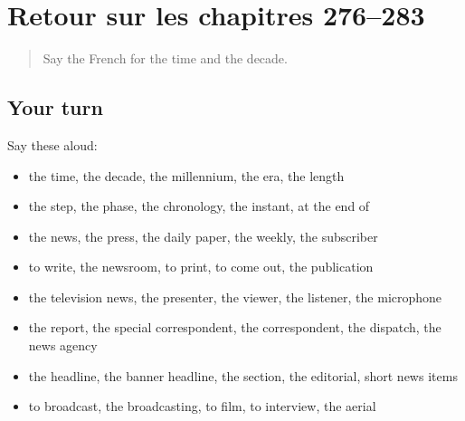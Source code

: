\section[(dialogue)]{Retour sur les chapitres 276–283}

\label{lesson:FR-R283-revision-276-283}



\begin{quote}
Say the French for the time and the decade.
\end{quote}

\subsection*{Your turn}
Say these aloud:

\begin{itemize}
\raggedright
  \item the time, the decade, the millennium, the era, the length
  \item the step, the phase, the chronology, the instant, at the end of
  \item the news, the press, the daily paper, the weekly, the subscriber
  \item to write, the newsroom, to print, to come out, the publication
  \item the television news, the presenter, the viewer, the listener, the microphone
  \item the report, the special correspondent, the correspondent, the dispatch, the news agency
  \item the headline, the banner headline, the section, the editorial, short news items
  \item to broadcast, the broadcasting, to film, to interview, the aerial
\end{itemize}


